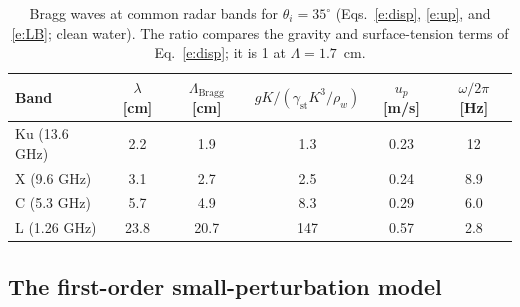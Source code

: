 \documentclass[11pt, oneside]{article}
\begin{document}
\begin{table}[!htbp]
	\centering
	\caption{Bragg waves at common radar bands for $\theta_i = 35^\circ$ (Eqs.~\ref{e:disp}, \ref{e:up}, and \ref{e:LB}; clean water). The ratio compares the gravity and surface-tension terms of Eq.~\ref{e:disp}; it is 1 at $\Lambda = 1.7$~cm.}
	\label{t:bragg}
	\begin{tabular}{lccccc}
		\hline
		Band & $\lambda$ [cm] & $\Lambda_\mathrm{Bragg}$ [cm] & $gK\big/\left(\gamma_\mathrm{st}K^3/\rho_w\right)$ & $u_p$ [m/s] & $\omega/2\pi$ [Hz] \\
		\hline
		Ku (13.6 GHz) & 2.2 & 1.9 & 1.3 & 0.23 & 12 \\
		X (9.6 GHz) & 3.1 & 2.7 & 2.5 & 0.24 & 8.9 \\
		C (5.3 GHz) & 5.7 & 4.9 & 8.3 & 0.29 & 6.0 \\
		L (1.26 GHz) & 23.8 & 20.7 & 147 & 0.57 & 2.8 \\
		\hline
	\end{tabular}
\end{table}

\subsection{The first-order small-perturbation model}
\end{document}
